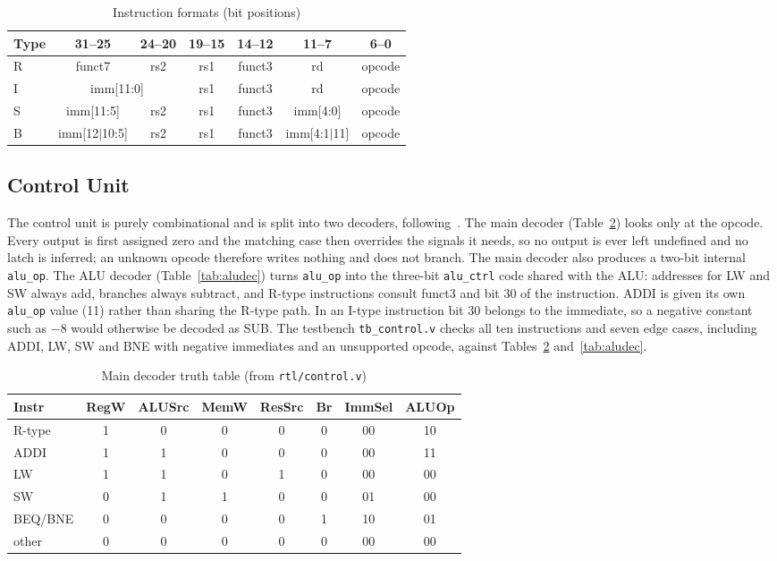 \documentclass[conference]{IEEEtran}
\begin{document}
\begin{table}[h]
\centering\footnotesize\setlength{\tabcolsep}{3pt}
\caption{Instruction formats (bit positions)}
\label{tab:formats}
\begin{tabular}{lcccccc}
\toprule
Type & 31--25 & 24--20 & 19--15 & 14--12 & 11--7 & 6--0 \\
\midrule
R & funct7 & rs2 & rs1 & funct3 & rd & opcode \\
I & \multicolumn{2}{c}{imm[11:0]} & rs1 & funct3 & rd & opcode \\
S & imm[11:5] & rs2 & rs1 & funct3 & imm[4:0] & opcode \\
B & imm[12$|$10:5] & rs2 & rs1 & funct3 & imm[4:1$|$11] & opcode \\
\bottomrule
\end{tabular}
\end{table}

\subsection{Control Unit}
The control unit is purely combinational and is split into two decoders,
following~\cite{harris2021digital}. The main decoder (Table~\ref{tab:control})
looks only at the opcode. Every output is first assigned zero and the matching
case then overrides the signals it needs, so no output is ever left undefined
and no latch is inferred; an unknown opcode therefore writes nothing and does
not branch. The main decoder also produces a two-bit internal \texttt{alu\_op}.
The ALU decoder (Table~\ref{tab:aludec}) turns \texttt{alu\_op} into the
three-bit \texttt{alu\_ctrl} code shared with the ALU: addresses for LW and SW
always add, branches always subtract, and R-type instructions consult funct3
and bit 30 of the instruction. ADDI is given its own \texttt{alu\_op} value
(11) rather than sharing the R-type path. In an I-type instruction bit 30
belongs to the immediate, so a negative constant such as $-8$ would otherwise
be decoded as SUB. The testbench \texttt{tb\_control.v} checks all ten
instructions and seven edge cases, including ADDI, LW, SW and BNE with
negative immediates and an unsupported opcode, against
Tables~\ref{tab:control} and~\ref{tab:aludec}.

\begin{table}[h]
\centering\scriptsize\setlength{\tabcolsep}{3pt}
\caption{Main decoder truth table (from \texttt{rtl/control.v})}
\label{tab:control}
\setlength{\tabcolsep}{2pt}\begin{tabular}{lccccccc}
\toprule
Instr & RegW & ALUSrc & MemW & ResSrc & Br & ImmSel & ALUOp \\
\midrule
R-type  & 1 & 0 & 0 & 0 & 0 & 00 & 10 \\
ADDI    & 1 & 1 & 0 & 0 & 0 & 00 & 11 \\
LW      & 1 & 1 & 0 & 1 & 0 & 00 & 00 \\
SW      & 0 & 1 & 1 & 0 & 0 & 01 & 00 \\
BEQ/BNE & 0 & 0 & 0 & 0 & 1 & 10 & 01 \\
other   & 0 & 0 & 0 & 0 & 0 & 00 & 00 \\
\bottomrule
\end{tabular}
\end{table}
\end{document}

